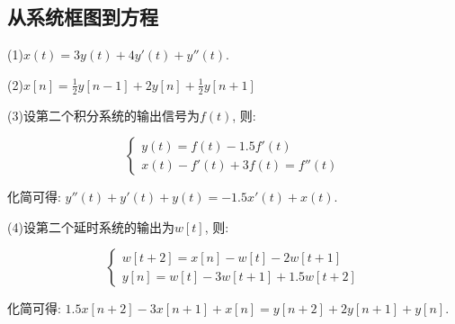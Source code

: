 \subsection{从系统框图到方程}
(1)$x(t)=3y(t)+4y'(t)+y''(t)$.

(2)$x[n]=\frac{1}{2}y[n-1]+2y[n]+\frac{1}{2}y[n+1]$

(3)设第二个积分系统的输出信号为$f(t)$, 则:

\begin{equation*}
    \left\{
        \begin{array}{l}
            y(t)=f(t)-1.5f'(t) \\
            x(t) - f'(t) + 3f(t)=f''(t)
        \end{array}
    \right.
\end{equation*}

化简可得: $y''(t)+y'(t)+y(t)=-1.5x'(t)+x(t)$.

(4)设第二个延时系统的输出为$w[t]$, 则:

\begin{equation*}
    \left\{
        \begin{array}{l}
            w[t+2]=x[n]-w[t]-2w[t+1] \\
            y[n] = w[t]-3w[t+1]+1.5w[t+2]
        \end{array}
    \right.
\end{equation*}

化简可得: $1.5x[n+2]-3x[n+1]+x[n]=y[n+2]+2y[n+1]+y[n]$.
